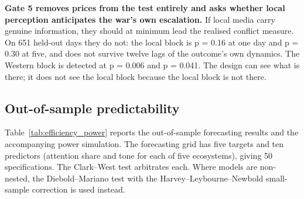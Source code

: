 \documentclass[12pt,a4paper]{article}
\begin{document}
\textbf{Gate 5 removes prices from the test entirely and asks whether local perception anticipates the war's own escalation.} If local media carry genuine information, they should at minimum lead the realised conflict measure. On 651 held-out days they do not: the local block is p = 0.16 at one day and p = 0.30 at five, and does not survive twelve lags of the outcome's own dynamics. The Western block is detected at p = 0.006 and p = 0.041. The design can see what is there; it does not see the local block because the local block is not there.

\subsection{Out-of-sample predictability}
\label{sec:efficiency}

Table~\ref{tab:efficiency_power} reports the out-of-sample forecasting results and the accompanying power simulation. The forecasting grid has five targets and ten predictors (attention share and tone for each of five ecosystems), giving 50 specifications. The Clark--West test \citep{clark2007} arbitrates each. Where models are non-nested, the Diebold--Mariano test \citep{diebold1995} with the Harvey--Leybourne--Newbold small-sample correction \citep{harvey1997} is used instead.
\end{document}
